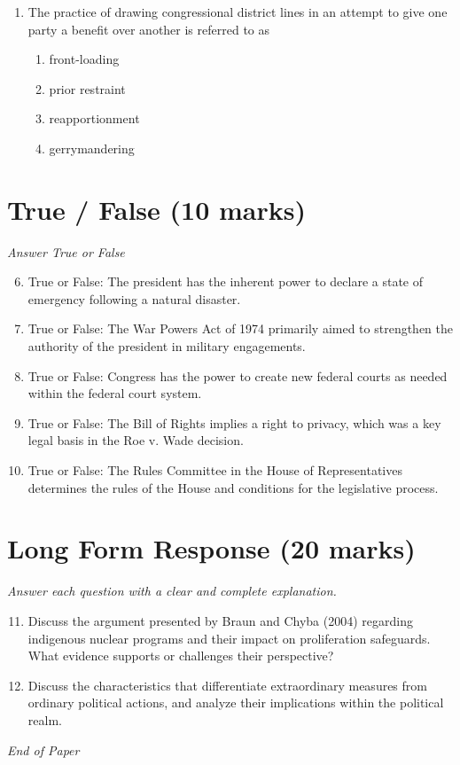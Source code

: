 \documentclass[12pt]{article}
\begin{document}
\begin{enumerate}[label=\arabic*.]
\begin{enumerate}[label=(\alph*)]
    \item income equality
    \item democracy
    \item individual liberty
    \item due process
\end{enumerate}
\item The practice of drawing congressional district lines in an attempt to give one party a benefit over another is referred to as
\begin{enumerate}[label=(\alph*)]
    \item front-loading
    \item prior restraint
    \item reapportionment
    \item gerrymandering
\end{enumerate}
\end{enumerate}

\section*{True / False (10 marks)}
\textit{Answer True or False}
\begin{enumerate}[label=\arabic*.]
\setcounter{enumi}{5}
\item True or False: The president has the inherent power to declare a state of emergency following a natural disaster.
\item True or False: The War Powers Act of 1974 primarily aimed to strengthen the authority of the president in military engagements.
\item True or False: Congress has the power to create new federal courts as needed within the federal court system.
\item True or False: The Bill of Rights implies a right to privacy, which was a key legal basis in the Roe v. Wade decision.
\item True or False: The Rules Committee in the House of Representatives determines the rules of the House and conditions for the legislative process.
\end{enumerate}

\section*{Long Form Response (20 marks)}
\textit{Answer each question with a clear and complete explanation.}
\begin{enumerate}[label=\arabic*.]
\setcounter{enumi}{10}
\item Discuss the argument presented by Braun and Chyba (2004) regarding indigenous nuclear programs and their impact on proliferation safeguards. What evidence supports or challenges their perspective?
\item Discuss the characteristics that differentiate extraordinary measures from ordinary political actions, and analyze their implications within the political realm.
\end{enumerate}

\vfill
\noindent\textit{End of Paper}
\end{document}
